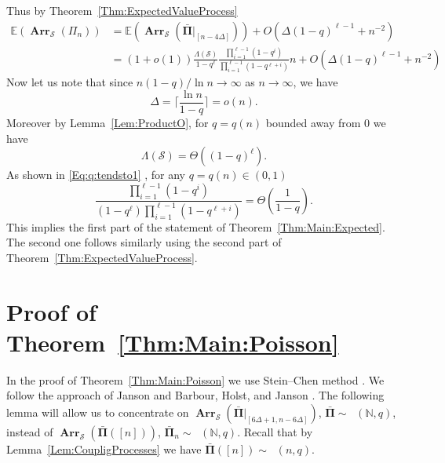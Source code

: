 \documentclass[letterpaper,11pt]{article}
\theoremstyle{definition}
\theoremstyle{remark}
\DeclareMathOperator{\Mallows}{Mallows_{seq}}
\newcommand{\bE}{\mathbb{E}}
\newcommand{\bN}{\mathbb{N}}
\newcommand{\productO}{\Lambda(\cS)}
\newcommand{\Arr}{\ensuremath{\operatorname{\mathbf{Arr}}}}
\newcommand{\barPi}{\bar {\mathbf \Pi}}
\newcommand{\NN}{\mathbb{N}}
\newcommand{\cS}{\mathcal{S}}
\begin{document}
Thus by Theorem~\ref{Thm:ExpectedValueProcess}
\begin{align*}
	\bE(\Arr_{\cS}(\varPi_n))&=\bE(\Arr_{\cS}(\barPi|_{[n-4\Delta]}))+O\left(\Delta(1-q)^{\ell-1}+n^{-2}\right)\\
	&=
	(1+o(1)) \frac{\productO}{1-q^\ell}\frac{\prod_{i=1}^{\ell-1}(1-q^i)}{\prod_{i=1}^{\ell-1}(1-q^{\ell+i})}n	+O\left(\Delta(1-q)^{\ell-1}+n^{-2}\right)
\end{align*}
Now let us note that since $n(1-q)/\ln n \to \infty$ as $n\to \infty$, we have
\[\Delta=\Bigg\lceil \frac{\ln n}{1-q}\Bigg\rceil = o(n).\]
Moreover by Lemma~\ref{Lem:ProductO}, for $q=q(n)$ bounded away from $0$ we have
\[\productO=\Theta((1-q)^{\ell}).\]
As shown in \eqref{Eq:q:tendsto1} , for any $q=q(n)\in (0,1)$
\[\frac{\prod_{i=1}^{\ell-1}(1-q^i)}{(1-q^\ell)\prod_{i=1}^{\ell-1}(1-q^{\ell+i})}=\Theta\left(\frac{1}{1-q}\right).\]
This implies the first part of the statement of Theorem~\ref{Thm:Main:Expected}. The second one follows similarly using the second part of Theorem~\ref{Thm:ExpectedValueProcess}.



\section{Proof of Theorem~\ref{Thm:Main:Poisson}}




In the proof of Theorem~\ref{Thm:Main:Poisson} we use  Stein--Chen method \cite{Chen1975, SteinBook}.
We follow the approach of Janson \cite{Janson1994} and Barbour, Holst, and Janson  \cite{BarbourHolstJansonBook}.
The following lemma will allow us to concentrate on $\Arr_{\cS}(\barPi|_{[6\Delta+1,n-6\Delta]})$, $\barPi\sim\Mallows(\NN,q)$, instead of $\Arr_{\cS}(\barPi([n]))$, $\barPi_n\sim\Mallows(\bN,q)$. Recall that by Lemma~\ref{Lem:CoupligProcesses} we have $\barPi([n])\sim \Mallows(n,q)$. 
\end{document}
